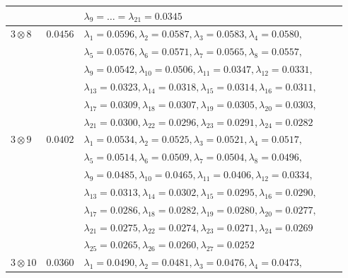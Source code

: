 \documentclass[reqno, 12pt,a4letter]{amsart}
\theoremstyle{definition}
\theoremstyle{plain}
\begin{document}
\begin{small}
\begin{table}
\begin{tabular}{|l|l|l|l|l|}
			&   &  $\lambda_9 = \dots = \lambda_{21} = 0.0345$ \\\hline
			
			$3 \otimes 8$ & $0.0456$  &  $\lambda_1=0.0596, \lambda_2=0.0587, \lambda_3 =0.0583, \lambda_4=0.0580,$ \\ 
			
			&   &  $\lambda_5=0.0576, \lambda_6=0.0571, \lambda_7 =0.0565, \lambda_8=0.0557,$ \\
			
			&   &  $\lambda_9=0.0542, \lambda_{10}=0.0506, \lambda_{11} =0.0347, \lambda_{12}=0.0331,$ \\ 
			
			&   &  $\lambda_{13}=0.0323, \lambda_{14}=0.0318, \lambda_{15} =0.0314, \lambda_{16} = 0.0311,$ \\
			
			&   &  $\lambda_{17}=0.0309, \lambda_{18}=0.0307, \lambda_{19} =0.0305, \lambda_{20} = 0.0303,$ \\ 
			
			&   &  $\lambda_{21}=0.0300, \lambda_{22}=0.0296, \lambda_{23} =0.0291, \lambda_{24} = 0.0282$ \\ \hline
			
			$3 \otimes 9$ & $0.0402$  &  $\lambda_1=0.0534, \lambda_2=0.0525, \lambda_3 =0.0521, \lambda_4=0.0517,$ \\ 
			
			&   &  $\lambda_5=0.0514, \lambda_6=0.0509, \lambda_7 =0.0504, \lambda_8=0.0496,$ \\
			
			&   &  $\lambda_9=0.0485, \lambda_{10}=0.0465, \lambda_{11} =0.0406, \lambda_{12}=0.0334,$ \\ 
			
			&   &  $\lambda_{13}=0.0313, \lambda_{14}=0.0302, \lambda_{15} =0.0295, \lambda_{16} = 0.0290,$ \\
			
			&   &  $\lambda_{17}=0.0286, \lambda_{18}=0.0282, \lambda_{19} =0.0280, \lambda_{20} = 0.0277,$ \\ 
			
			&   &  $\lambda_{21}=0.0275, \lambda_{22}=0.0274, \lambda_{23} =0.0271, \lambda_{24} = 0.0269$ \\ 
			
			&   &  $\lambda_{25}=0.0265, \lambda_{26}=0.0260, \lambda_{27} =0.0252$ \\ \hline
			
			$3 \otimes 10$ & $0.0360$  &  $\lambda_1=0.0490, \lambda_2=0.0481, \lambda_3 =0.0476, \lambda_4=0.0473,$ \\ 
			

\end{tabular}
\end{table}
\end{small}
\end{document}
